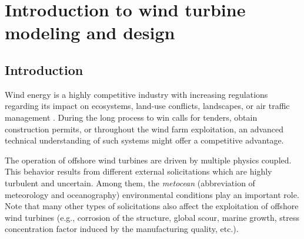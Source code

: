 \chapter{Introduction to wind turbine modeling and design}
\hfill
\localtableofcontents
\newpage







\section{Introduction}

Wind energy is a highly competitive industry with increasing regulations regarding its impact on ecosystems, land-use conflicts, landscapes, or air traffic management \citep{eolien_en_mer_2022}. 
During the long process to win calls for tenders, obtain construction permits, or throughout the wind farm exploitation, an advanced technical understanding of such systems might offer a competitive advantage. 

The operation of offshore wind turbines are driven by multiple physics coupled. 
This behavior results from different external solicitations which are highly turbulent and uncertain. 
Among them, the \textit{metocean} (abbreviation of meteorology and oceanography) environmental conditions play an important role. 
Note that many other types of solicitations also affect the exploitation of offshore wind turbines (e.g., corrosion of the structure, global scour, marine growth, stress concentration factor induced by the manufacturing quality, etc.). 

